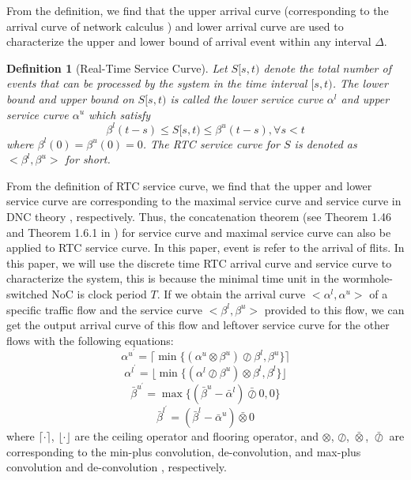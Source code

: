 \documentclass[10pt,journal]{IEEEtran}
\newtheorem{definition}{Definition}
\begin{document}
From the definition, we find that the upper arrival curve (corresponding to the arrival curve of network calculus \cite{Boudec2001Network}) and lower arrival curve are used to characterize the upper and lower bound of arrival event within any interval $\Delta$.

\begin{definition}[Real-Time Service Curve]
Let $S[s,t)$ denote the total number of events that can be processed by the system in the time interval $[s,t)$. The lower bound and upper bound on $S[s,t)$ is called the lower service curve $\alpha^l$ and upper service curve $\alpha^u$ which satisfy
$$\beta^l(t-s)\leq S[s,t)\leq \beta^u(t-s),\forall s<t$$
where $\beta^l(0)=\beta^u(0)=0$. The RTC service curve for $S$ is denoted as $<\beta^l,\beta^u>$ for short.
\end{definition}

From the definition of RTC service curve, we find that the upper and lower service curve are corresponding to the maximal service curve and service curve in DNC theory \cite{Boudec2001Network}, respectively. Thus, the concatenation theorem (see Theorem 1.46 and Theorem 1.6.1 in \cite{Boudec2001Network}) for service curve and maximal service curve can also be applied to RTC service curve. In this paper, event is refer to the arrival of flits. In this paper, we will use the discrete time RTC arrival curve and service curve to characterize the system, this is because the minimal time unit in the wormhole-switched NoC is clock period $T$. If we obtain the arrival curve $<\alpha^l,\alpha^u>$ of a specific traffic flow and the service curve $<\beta^l,\beta^u>$ provided to this flow, we can get the output arrival curve of this flow and leftover service curve for the other flows with the following equations:
\begin{equation}\label{alphau}
\alpha^{u^\prime}=\lceil\min\{(\alpha^u\otimes\beta^u)\oslash\beta^l,\beta^u\}\rceil
\end{equation}
\begin{equation}\label{alphal}
\alpha^{l^\prime}=\lfloor\min\{(\alpha^l\oslash\beta^u)\otimes\beta^l,\beta^l\}\rfloor
\end{equation}
\begin{equation}\label{betau}
\bar{\beta}^{u^\prime}=\max\{(\bar{\beta}^u-\bar{\alpha}^l)\bar{\oslash}0,0\}
\end{equation}
\begin{equation}\label{betal}
\bar{\beta}^{l^\prime}=(\bar{\beta}^l-\bar{\alpha}^u)\bar{\otimes}0
\end{equation}
where $\lceil\cdot\rceil$, $\lfloor\cdot\rfloor$ are the ceiling operator and flooring operator, and $\otimes$, $\oslash$, $\bar{\otimes}$, $\bar{\oslash}$ are corresponding to the min-plus convolution, de-convolution, and max-plus convolution and de-convolution \cite{Boudec2001Network}, respectively.
\end{document}
